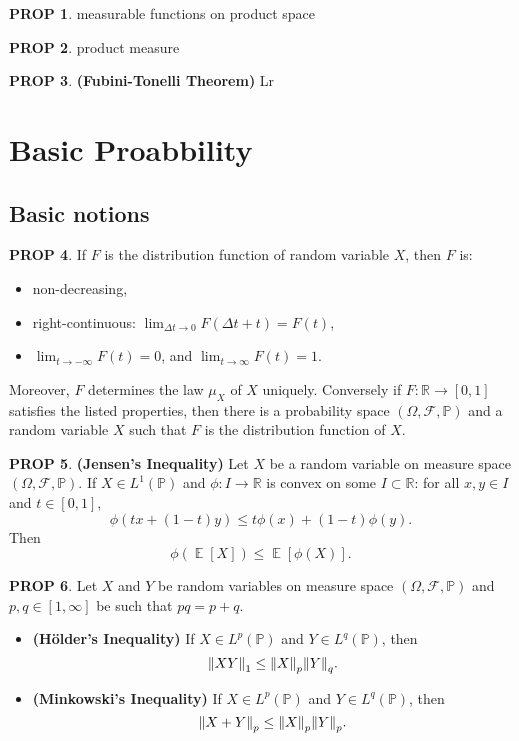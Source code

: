 \documentclass[hidelinks,11pt]{article}
\theoremstyle{definition}
\theoremstyle{dotless}
\newtheorem{prop}{PROP}[section]
\theoremstyle{remark}
\DeclareMathOperator{\E}{\mathbb{E}}
\DeclareMathOperator{\1}{\mathbf{1}}
\begin{document}
\begin{prop}
measurable functions on product space
\end{prop}

\begin{prop}
product measure
\end{prop}

\begin{prop}\textup{\textbf{(Fubini-Tonelli Theorem)}} Lr
\end{prop}

\newpage
\section{Basic Proabbility}

\subsection{Basic notions}

\begin{prop}\label{Prop 2.1}
If $F$ is the distribution function of random variable $X$, then $F$ is:\begin{itemize}
    \item non-decreasing,
    \item right-continuous: $\lim_{\Delta t\to0}F(\Delta t+t)=F(t)$,
    \item $\lim_{t\to-\infty}F(t)=0$, and $\lim_{t\to\infty}F(t)=1$.
\end{itemize}
Moreover, $F$ determines the law $\mu_X$ of $X$ uniquely. Conversely if $F:\mathbb{R}\to[0,1]$ satisfies the listed properties, then there is a probability space $(\Omega, \mathcal{F},\mathbb{P})$ and a random variable $X$ such that $F$ is the distribution function of $X$.
\end{prop}

\begin{prop}\textup{\textbf{(Jensen's Inequality) }}Let $X$ be a random variable on measure space $(\Omega,\mathcal{F},\mathbb{P})$. If $X\in L^1(\mathbb{P})$ and $\phi:I\to\mathbb{R}$ is convex on some $I\subset\mathbb{R}$: for all $x,y\in I$ and $t\in[0,1]$,
\[\phi(tx+(1-t)y)\leq t\phi(x)+(1-t)\phi(y).\]
Then
\[\phi(\E[X])\leq\E[\phi(X)].\]
\end{prop}

\begin{prop}
Let $X$ and $Y$ be random variables on measure space $(\Omega,\mathcal{F},\mathbb{P})$ and $p,q\in[1,\infty]$ be such that $pq=p+q$.
\begin{itemize}
    \item \textup{\textbf{(Hölder's Inequality)}} If $X\in L^p(\mathbb{P})$ and $Y\in L^q(\mathbb{P})$, then
    \[\norm{XY}_1\leq\norm{X}_p\norm{Y}_q.\]
    \item \textup{\textbf{(Minkowski's Inequality)}} If $X\in L^p(\mathbb{P})$ and $Y\in L^q(\mathbb{P})$, then
    \[\norm{X+Y}_{p}\leq\norm{X}_p\norm{Y}_p.\]
\end{itemize}
\end{prop}
\end{document}
